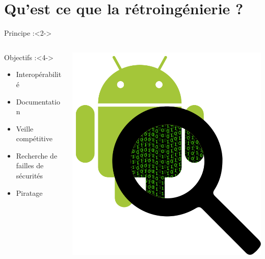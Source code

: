 \documentclass[11pt,aspectratio=1610]{beamer}%
\begin{document}
\section{Qu'est ce que la rétroingénierie ?}
  \begin{frame}[t]
      \slidetitle[]
      \begin{block}{Principe :}<2->
      \end{block}
      \vfill
      \begin{columns}
        \begin{column}{.7\linewidth}
          \begin{block}{Objectifs :}<4->
            \begin{itemize}
            \item<5-> Interopérabilité
            \item<6-> Documentation
            \item<7-> Veille compétitive
            \item<8-> Recherche de failles de sécurités
            \item<9-> Piratage
            \end{itemize}
          \end{block}
        \end{column}
        \begin{column}{.25\linewidth}
          \centering
          \includegraphics[width=\linewidth]{img/android_loupe.png}
        \end{column}
      \end{columns}
      \vfill
  \end{frame}
\end{document}
